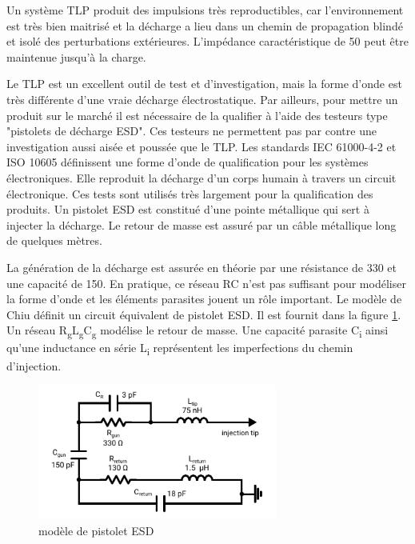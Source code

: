 Un système TLP produit des impulsions très reproductibles, car l'environnement est très bien maitrisé et la décharge a lieu dans un chemin de propagation blindé et isolé des perturbations extérieures.
L'impédance caractéristique de 50\textOmega{} peut être maintenue jusqu'à la charge.

Le TLP est un excellent outil de test et d'investigation, mais la forme d'onde est très différente d'une vraie décharge électrostatique.
Par ailleurs, pour mettre un produit sur le marché il est nécessaire de la qualifier à l'aide des testeurs type "pistolets de décharge ESD".
Ces testeurs ne permettent pas par contre une investigation aussi aisée et poussée que le TLP.
Les standards IEC 61000-4-2 \cite{iec61000-4-2} et ISO 10605 \cite{iso10605} définissent une forme d'onde de qualification pour les systèmes électroniques.
Elle reproduit la décharge d'un corps humain à travers un circuit électronique.
Ces tests sont utilisés très largement pour la qualification des produits.
Un pistolet ESD est constitué d'une pointe métallique qui sert à injecter la décharge.
Le retour de masse est assuré par un câble métallique long de quelques mètres.

La génération de la décharge est assurée en théorie par une résistance de 330\textOmega{} et une capacité de 150.
En pratique, ce réseau RC n'est pas suffisant pour modéliser la forme d'onde et les éléments parasites jouent un rôle important.
Le modèle de Chiu \cite{phd-chiu} définit un circuit équivalent de pistolet ESD.
Il est fournit dans la figure \ref{fig:esd-gun-model}.
Un réseau R\textsubscript{g}L\textsubscript{g}C\textsubscript{g} modélise le retour de masse.
Une capacité parasite C\textsubscript{i} ainsi qu'une inductance en série L\textsubscript{i} représentent les imperfections du chemin d'injection.

\begin{figure}[!h]
  \centering
  \includegraphics[width=0.7\textwidth]{src/1/figures/gun_model.pdf}
  \caption{modèle de pistolet ESD}
  \label{fig:esd-gun-model}
\end{figure}

